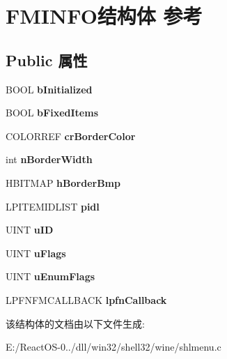\hypertarget{struct_f_m_i_n_f_o}{}\section{F\+M\+I\+N\+F\+O结构体 参考}
\label{struct_f_m_i_n_f_o}
\subsection*{Public 属性}
\begin{DoxyCompactItemize}
\item 
\mbox{\label{struct_f_m_i_n_f_o_a8a25746956d38ef10c6ccdedd3fda6ad}} 
B\+O\+OL {\bfseries b\+Initialized}
\item 
\mbox{\label{struct_f_m_i_n_f_o_abd4a2b803f22b17af415e77737870b80}} 
B\+O\+OL {\bfseries b\+Fixed\+Items}
\item 
\mbox{\label{struct_f_m_i_n_f_o_a6618f20c8aebfbf2ece427663a2fcbc5}} 
C\+O\+L\+O\+R\+R\+EF {\bfseries cr\+Border\+Color}
\item 
\mbox{\label{struct_f_m_i_n_f_o_a5640f185fe36c441be7dc28ca735e797}} 
int {\bfseries n\+Border\+Width}
\item 
\mbox{\label{struct_f_m_i_n_f_o_aa1e9311698ff714c28cfca1afbf00b35}} 
H\+B\+I\+T\+M\+AP {\bfseries h\+Border\+Bmp}
\item 
\mbox{\label{struct_f_m_i_n_f_o_a33a30b95160f0c89e81dd8355030a531}} 
L\+P\+I\+T\+E\+M\+I\+D\+L\+I\+ST {\bfseries pidl}
\item 
\mbox{\label{struct_f_m_i_n_f_o_a2a5a43ac2918682df51a3472df49cd37}} 
U\+I\+NT {\bfseries u\+ID}
\item 
\mbox{\label{struct_f_m_i_n_f_o_a47892b5351dbfc486b1b0895141bbab5}} 
U\+I\+NT {\bfseries u\+Flags}
\item 
\mbox{\label{struct_f_m_i_n_f_o_adf578ed6b8cd8528643a7dd44db9eb57}} 
U\+I\+NT {\bfseries u\+Enum\+Flags}
\item 
\mbox{\label{struct_f_m_i_n_f_o_aad77d43aa2b48ab22cb02df40bc1be00}} 
L\+P\+F\+N\+F\+M\+C\+A\+L\+L\+B\+A\+CK {\bfseries lpfn\+Callback}
\end{DoxyCompactItemize}


该结构体的文档由以下文件生成\+:\begin{DoxyCompactItemize}
\item 
E\+:/\+React\+O\+S-\/0../dll/win32/shell32/wine/shlmenu.\+c\end{DoxyCompactItemize}
